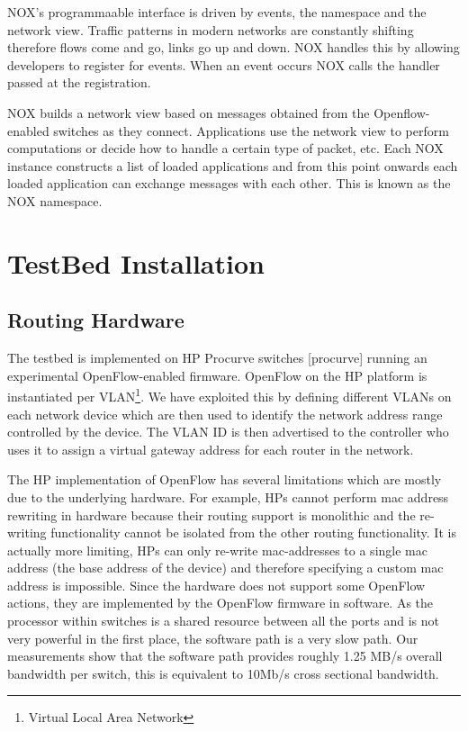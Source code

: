 NOX's programmaable interface is driven by events, the namespace and the network
view. Traffic patterns in modern networks are constantly shifting therefore
flows come and go, links go up and down. NOX handles this by allowing developers
to register for events. When an event occurs NOX calls the handler passed at
the registration. 
  
NOX builds a network view based on messages obtained from the Openflow-enabled
switches as they connect. Applications use the network view to perform
computations or decide how to handle a certain type of packet, etc. Each NOX
instance constructs a list of loaded applications and from this point onwards
each loaded application can exchange messages with each other. This is known
as the NOX namespace. 
	

\section{TestBed Installation}

\subsection{Routing Hardware}
\label{sect:NetHard}

The testbed is implemented on HP Procurve switches [procurve] running an
experimental OpenFlow-enabled firmware. OpenFlow on the HP platform is
instantiated per VLAN\footnote{Virtual Local Area Network}. We have exploited
this by defining different VLANs on each network device which are then used to
identify the network address range controlled by the device. The VLAN ID is
then advertised to the controller who uses it to assign a virtual gateway
address for each router in the network. 

The HP implementation of OpenFlow has several limitations which are mostly due
to the underlying hardware. For example, HPs cannot perform mac address
rewriting in hardware because their routing support is monolithic and the
re-writing functionality cannot be isolated from the other routing
functionality. It is actually more limiting, HPs can only re-write mac-addresses
to a single mac address (the base address of the device) and therefore
specifying a custom mac address is impossible. Since the hardware does not
support some OpenFlow actions, they are implemented by the OpenFlow firmware in
software. As the processor within switches is a shared resource between all the
ports and is not very powerful in the first place, the software path is a
very slow path. Our measurements show that the software path provides roughly
1.25 MB/s overall bandwidth per switch, this is equivalent to 10Mb/s cross
sectional bandwidth. 

